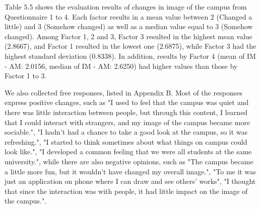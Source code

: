 Table 5.5 shows the evaluation results of changes in image of the campus from Questionnaire 1 to 4.
Each factor results in a mean value between 2 (Changed a little) and 3 (Somehow changed) as well as a median value equal to 3 (Somehow changed).
Among Factor 1, 2 and 3, Factor 3 resulted in the highest mean value (2.8667), and Factor 1 resulted in the lowest one (2.6875),
while Factor 3 had the highest standard deviation (0.8338).
In addition, results by Factor 4 (mean of IM - AM: 2.0156, median of IM - AM: 2.6250) had higher values than those by Factor 1 to 3.

We also collected free responses, listed in Appendix B. Most of the responses express positive changes, such as "I used to feel that the campus was quiet and there was little interaction between people, but through this content, I learned that I could interact with strangers, and my image of the campus became more sociable.",
"I hadn't had a chance to take a good look at the campus, so it was refreshing.", "I started to think sometimes about what things on campus could look like.", "I developed a common feeling that we were all students at the same university.",
while there are also negative opinions, such as "The campus became a little more fun, but it wouldn't have changed my overall image.", "To me it was just an application on phone where I can draw and see others' works", "I thought that since the interaction was with people, it had little impact on the image of the campus.".

